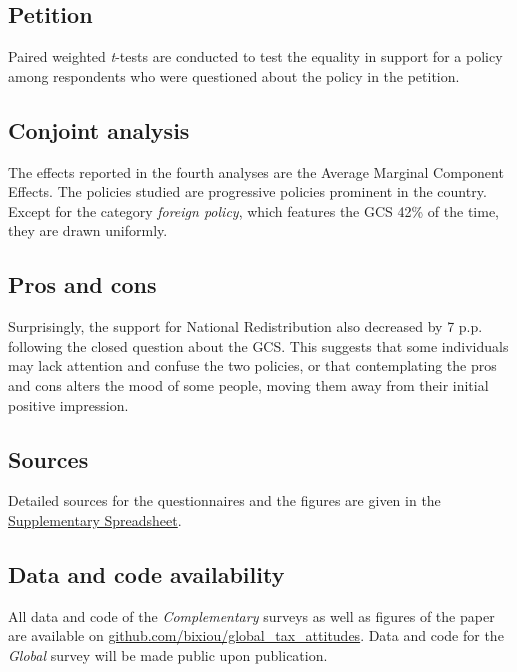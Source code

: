 \documentclass{nature}
\begin{document}
\begin{methods}
\subsection{Petition}
Paired weighted \textit{t}-tests are conducted to test the equality in support for a policy among respondents who were questioned about the policy in the petition.

\subsection{Conjoint analysis}
The effects reported in the fourth analyses are the Average Marginal Component Effects.\cite{hainmueller_causal_2014} The policies studied are progressive policies prominent in the country. Except for the category \textit{foreign policy}, which features the GCS 42\% of the time, they are drawn uniformly.

\subsection{Pros and cons}
Surprisingly, the support for National Redistribution also decreased by 7 p.p. following the closed question about the GCS. This suggests that some individuals may lack attention and confuse the two policies, or that contemplating the pros and cons alters the mood of some people, moving them away from their initial positive impression.

\subsection{Sources}
Detailed sources for the questionnaires and the figures are given in the \href{https://github.com/bixiou/global_tax_attitudes/raw/main/questionnaire/specificities.xlsx}{Supplementary Spreadsheet}.

\subsection{\normalsize Data and code availability}

All data and code of the \textit{Complementary} surveys as well as figures of the paper are available on \href{https://github.com/bixiou/global_tax_attitudes}{github.com/bixiou/global\_tax\_attitudes}. Data and code for the \textit{Global} survey will be made public upon publication.

\end{methods} %
\end{document}
